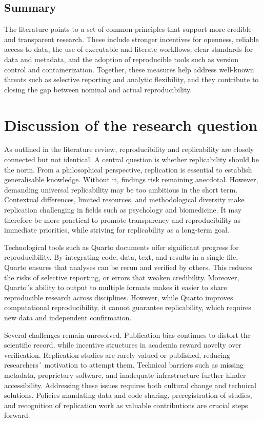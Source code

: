 \documentclass[
  a4paper,
]{article}
\begin{document}
\subsection{Summary}\label{summary}

The literature points to a set of common principles that support more
credible and transparent research. These include stronger incentives for
openness, reliable access to data, the use of executable and literate
workflows, clear standards for data and metadata, and the adoption of
reproducible tools such as version control and containerization.
Together, these measures help address well-known threats such as
selective reporting and analytic flexibility, and they contribute to
closing the gap between nominal and actual reproducibility.

\section{Discussion of the research
question}\label{discussion-of-the-research-question}

As outlined in the literature review, reproducibility and replicability
are closely connected but not identical. A central question is whether
replicability should be the norm. From a philosophical perspective,
replication is essential to establish generalisable knowledge. Without
it, findings risk remaining anecdotal. However, demanding universal
replicability may be too ambitious in the short term. Contextual
differences, limited resources, and methodological diversity make
replication challenging in fields such as psychology and biomedicine. It
may therefore be more practical to promote transparency and
reproducibility as immediate priorities, while striving for
replicability as a long-term goal.

Technological tools such as Quarto documents offer significant progress
for reproducibility. By integrating code, data, text, and results in a
single file, Quarto ensures that analyses can be rerun and verified by
others. This reduces the risks of selective reporting, or errors that
weaken credibility. Moreover, Quarto´s ability to output to multiple
formats makes it easier to share reproducible research across
disciplines. However, while Quarto improves computational
reproducibility, it cannot guarantee replicability, which requires new
data and independent confirmation.

Several challenges remain unresolved. Publication bias continues to
distort the scientific record, while incentive structures in academia
reward novelty over verification. Replication studies are rarely valued
or published, reducing researchers´ motivation to attempt them.
Technical barriers such as missing metadata, proprietary software, and
inadequate infrastructure further hinder accessibility. Addressing these
issues requires both cultural change and technical solutions. Policies
mandating data and code sharing, preregistration of studies, and
recognition of replication work as valuable contributions are crucial
steps forward.
\end{document}
